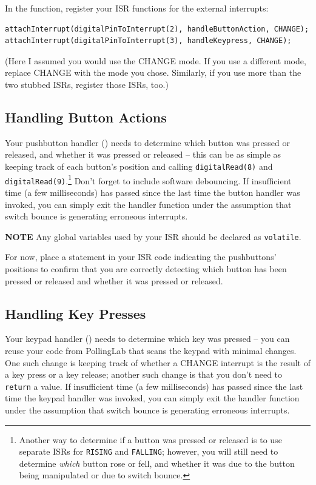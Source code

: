 In the  function, register your ISR functions for the external
interrupts:
\begin{lstlisting}
attachInterrupt(digitalPinToInterrupt(2), handleButtonAction, CHANGE);
attachInterrupt(digitalPinToInterrupt(3), handleKeypress, CHANGE);
\end{lstlisting}
(Here I assumed you would use the CHANGE mode. If you use a different mode,
replace CHANGE with the mode you chose. Similarly, if you use more than the two
stubbed ISRs, register those ISRs, too.)

\subsection{Handling Button Actions}

Your pushbutton handler () needs to
determine which button was pressed or released, and whether it was pressed or
released -- this can be as simple as keeping track of each button's position and
calling \lstinline{digitalRead(8)} and
\lstinline{digitalRead(9)}.\footnote{Another way to determine if a button was
pressed or released is to use separate ISRs for \lstinline{RISING} and
\lstinline{FALLING}; however, you will still need to determine \textit{which}
button rose or fell, and whether it was due to the button being manipulated or
due to switch bounce.} Don't forget to include software debouncing. If
insufficient time (a few milliseconds) has passed since the last time the button
handler was invoked, you can simply exit the handler function under the
assumption that switch bounce is generating erroneous interrupts.

\textbf{NOTE} Any global variables used by your ISR should be declared as
\lstinline{volatile}.

For now, place a  statement in your ISR code indicating the
pushbuttons' positions to confirm that you are correctly detecting which button
has been pressed or released and whether it was pressed or released.

\subsection{Handling Key Presses}

Your keypad handler () needs to determine which key was
pressed -- you can reuse your code from PollingLab that scans the keypad with
minimal changes. One such change is keeping track of whether a CHANGE interrupt
is the result of a key press or a key release; another such change is that you
don't need to \lstinline{return} a value. If insufficient time (a few
milliseconds) has passed since the last time the keypad handler was invoked, you
can simply exit the handler function under the assumption that switch bounce is
generating erroneous interrupts.

